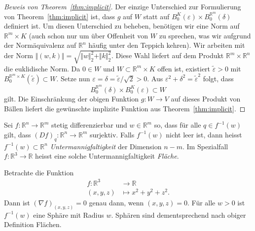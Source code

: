 \documentclass[../main.tex]{subfiles}
\begin{document}
\begin{proof}[Beweis von Theorem~\ref{thm:implicit}]
  Der einzige Unterschied zur Formulierung von Theorem~\ref{thm:implicit}
  ist, dass $g$ auf $W$ statt auf
  $B_0^K(\varepsilon) \times B_0^{\mathbb{R}^m}(\delta)$
  definiert ist.
  Um diesen Unterschied zu beheben, benötigen wir eine Norm
  auf $\mathbb{R}^m \times K$ (auch schon nur um über Offenheit von $W$
  zu sprechen, was wir aufgrund der Normäquivalenz auf $\mathbb{R}^n$
  häufig unter den Teppich kehren).
  Wir arbeiten mit der Norm $\Vert (w, k) \Vert =
  \sqrt{\Vert w \Vert_2^2 + \Vert k \Vert_2^2}$.
  Diese Wahl liefert auf dem Produkt
  $\mathbb{R}^m \times \mathbb{R}^n$ die euklidische Norm.
  Da $0 \in W$ und $W \subset \mathbb{R}^m \times K$
  offen ist, existiert $\widetilde \varepsilon > 0$
  mit $B_0^{\mathbb{R}^m \times K}(\widetilde \varepsilon) \subset W$.
  Setze nun $\varepsilon = \delta = \widetilde \varepsilon / \sqrt 2 > 0$.
  Aus $\varepsilon^2 + \delta^2 = \widetilde \varepsilon^2$
  folgt, dass
  \[
    B_0^{\mathbb{R}^m}(\delta) \times B_0^{K}(\varepsilon) \subset W
  \]
  gilt.
  Die Einschränkung der obigen Funktion $g \colon W \to V$
  auf dieses Produkt von Bällen liefert die gewünschte implizite
  Funktion aus Theorem~\ref{thm:implicit}.
\end{proof}

\begin{definition}
  Sei $f \colon \mathbb{R}^n \to \mathbb{R}^m$ stetig differenzierbar
  und $w \in \mathbb{R}^m$
  so, dass für alle $q \in f^{-1}(w)$
  gilt, dass ${(Df)}_q \colon \mathbb{R}^n \to \mathbb{R}^m$
  surjektiv.
  Falls $f^{-1}(w)$ nicht leer ist,
  dann heisst $f^{-1}(w) \subset \mathbb{R}^n$
  \emph{Untermannigfaltigkeit} der Dimension $n - m$.
  Im Spezialfall $f \colon \mathbb{R}^3 \to \mathbb{R}$
  heisst eine solche Untermannigfaltigkeit \emph{Fläche}.
\end{definition}

\begin{example}
  Betrachte die Funktion
  \begin{align*}
    f \colon \mathbb{R}^3 & \to \mathbb{R} \\
    (x, y, z) & \mapsto x^2 + y^2 + z^2.
  \end{align*}
  Dann ist ${(\nabla f)}_{(x, y, z)} = 0$
  genau dann, wenn $(x, y, z) = 0$.
  Für alle $w > 0$ ist $f^{-1}(w)$ eine Sphäre mit Radius $w$.
  Sphären sind dementsprechend nach obiger Definition Flächen.
\end{example}
\end{document}
